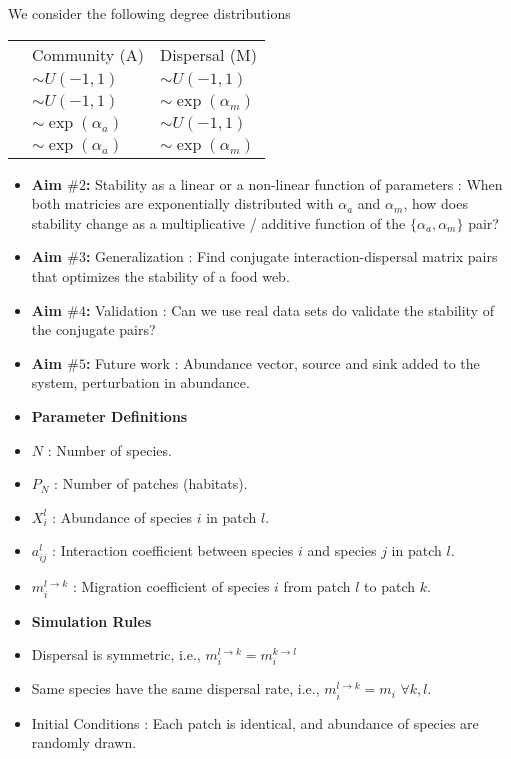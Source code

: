 \documentclass[12pt]{article}
\begin{document}
We consider the following degree distributions
\begin{table}[!h]
\centering
\begin{tabular}{lll}
 & Community (A) & Dispersal (M)  \\
 & $\sim U(-1,1)$ & $\sim U(-1,1)$  \\
 & $\sim U(-1,1)$ & $\sim \exp(\alpha_m)$  \\
 & $\sim \exp(\alpha_a)$ & $\sim U(-1,1)$  \\
 & $\sim \exp(\alpha_a)$ & $\sim \exp(\alpha_m)$
\end{tabular}
\end{table}
\begin{itemize}
\item \textbf{Aim $\#2$: } Stability as a linear or a non-linear function of parameters : When both matricies are exponentially distributed with $\alpha_a$ and $\alpha_m$, how does stability change as a multiplicative / additive function of the $\{\alpha_a,\alpha_m\}$ pair?
\item \textbf{Aim $\#3$: } Generalization : Find conjugate interaction-dispersal matrix pairs that optimizes the stability of a food web.
\item \textbf{Aim $\#4$: } Validation : Can we use real data sets do validate the stability of the conjugate pairs?
\item \textbf{Aim $\#5$: } Future work :  Abundance vector, source and sink added to the system, perturbation in abundance.
\item [] \textbf{Parameter Definitions}
\item $N$ : Number of species.
\item $P_N$ : Number of patches (habitats). 
\item $X_{i}^{l}$ : Abundance of species $i$ in patch $l$.
\item $a_{ij}^{l}$ : Interaction coefficient between species $i$ and species $j$ in patch $l$.
\item $m_{i}^{l \rightarrow k}$ : Migration coefficient of species $i$ from patch $l$ to patch $k$.
\item [] \textbf{Simulation Rules}
\item Dispersal is symmetric, i.e.,  $m_{i}^{l \rightarrow k}=m_{i}^{k \rightarrow l}$
\item Same species have the same dispersal rate, i.e., $m_{i}^{l \rightarrow k} = m_{i}\,\, \forall k, l.$
\item Initial Conditions : Each patch is identical, and abundance of species are randomly drawn.
\end{itemize}
\end{document}
